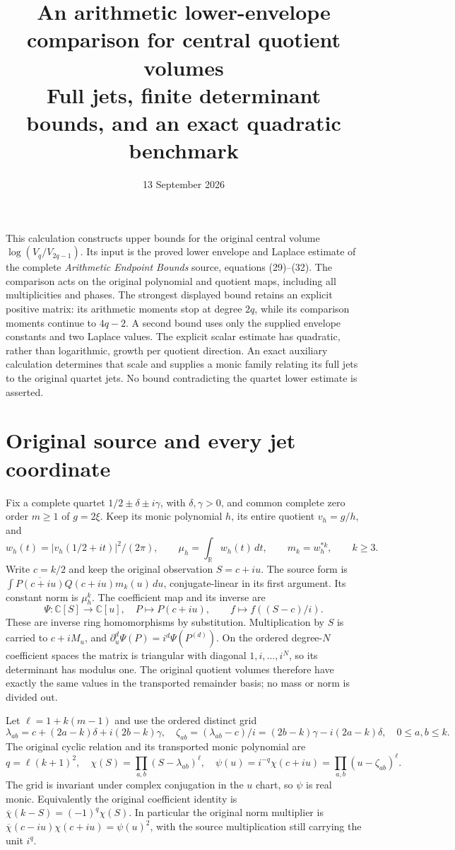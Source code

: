 \documentclass[11pt]{article}
\title{An arithmetic lower-envelope comparison for central quotient volumes\\
Full jets, finite determinant bounds, and an exact quadratic benchmark}
\author{}
\date{13 September 2026}
\newcommand{\C}{\mathbb C}
\newcommand{\R}{\mathbb R}
\begin{document}
\maketitle

This calculation constructs upper bounds for the original central volume
$\log(V_q/V_{2q-1})$. Its input is the proved lower envelope and Laplace
estimate of the complete \emph{Arithmetic Endpoint Bounds} source, equations
(29)--(32). The comparison acts on the original polynomial and quotient
maps, including all multiplicities and phases. The strongest displayed
bound retains an explicit positive matrix: its arithmetic moments stop at
degree $2q$, while its comparison moments continue to $4q-2$. A second
bound uses only the supplied envelope constants and two Laplace values.
The explicit scalar estimate has quadratic, rather than logarithmic,
growth per quotient direction. An exact auxiliary calculation determines
that scale and supplies a monic family relating its full jets to the
original quartet jets. No bound contradicting the quartet lower estimate
is asserted.

\section{Original source and every jet coordinate}

Fix a complete quartet $1/2\pm\delta\pm i\gamma$, with
$\delta,\gamma>0$, and common complete zero order $m\ge1$ of $g=2\xi$.
Keep its monic polynomial $h$, its entire quotient $v_h=g/h$, and
\[
 w_h(t)=|v_h(1/2+it)|^2/(2\pi),\qquad
 \mu_h=\int_\R w_h(t)\,dt,\qquad m_k=w_h^{*k},\qquad k\ge3.
 \tag{AU.1}
\]
Write $c=k/2$ and keep the original observation $S=c+iu$. The source
form is $\int\overline{P(c+iu)}Q(c+iu)m_k(u)\,du$, conjugate-linear
in its first argument. Its constant norm is $\mu_h^k$.
The coefficient map and its inverse are
\[
 \Psi:\C[S]\longrightarrow\C[u],\quad P\longmapsto P(c+iu),
 \qquad f\longmapsto f((S-c)/i).                             \tag{AU.2}
\]
These are inverse ring homomorphisms by substitution. Multiplication by
$S$ is carried to $c+iM_u$, and
$\partial_u^d\Psi(P)=i^d\Psi(P^{(d)})$. On the ordered degree-$N$
coefficient spaces the matrix is triangular with diagonal
$1,i,\ldots,i^N$, so its determinant has modulus one. The original
quotient volumes therefore have exactly the same values in the
transported remainder basis; no mass or norm is divided out.

Let $\ell=1+k(m-1)$ and use the ordered distinct grid
\[
 \lambda_{ab}=c+(2a-k)\delta+i(2b-k)\gamma,
 \quad \zeta_{ab}=(\lambda_{ab}-c)/i
     =(2b-k)\gamma-i(2a-k)\delta,
 \quad 0\le a,b\le k.                                      \tag{AU.3}
\]
The original cyclic relation and its transported monic polynomial are
\[
 q=\ell(k+1)^2,\quad
 \chi(S)=\prod_{a,b}(S-\lambda_{ab})^\ell,\quad
 \psi(u)=i^{-q}\chi(c+iu)=\prod_{a,b}(u-\zeta_{ab})^\ell.
 \tag{AU.4}
\]
The grid is invariant under complex conjugation in the $u$ chart, so
$\psi$ is real monic. Equivalently the original coefficient identity is
$\overline\chi(k-S)=(-1)^q\chi(S)$. In particular the original norm
multiplier is $\overline\chi(c-iu)\chi(c+iu)=\psi(u)^2$, with the
source multiplication still carrying the unit $i^q$.
\end{document}
